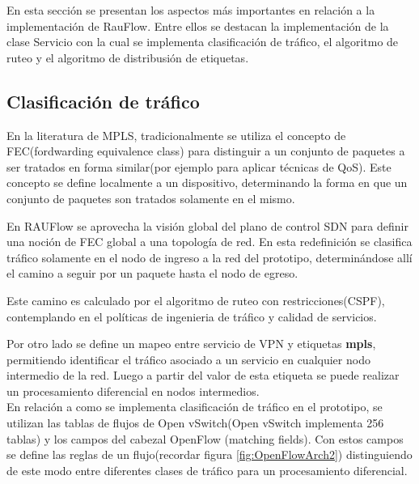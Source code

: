 En esta secci\'on se presentan los aspectos m\'as importantes en relaci\'on a la implementaci\'on de RauFlow. Entre ellos se destacan la implementaci\'on de la clase Servicio con la cual se implementa  clasificaci\'on de tr\'afico, el algoritmo de ruteo y el algoritmo de distribusi\'on de etiquetas.\\

\subsection{Clasificación de tr\'afico}
En la literatura de MPLS, tradicionalmente se utiliza el concepto de FEC(fordwarding equivalence class) para distinguir a un conjunto de paquetes a ser tratados en forma similar(por ejemplo para aplicar t\'ecnicas de QoS). Este concepto se define localmente a un dispositivo, determinando la forma en que un conjunto de paquetes son tratados solamente en el mismo.

En RAUFlow se aprovecha la visi\'on global del plano de control SDN para definir una noci\'on de FEC global a una topolog\'ia de red. En esta redefinici\'on se clasifica tr\'afico solamente en el nodo de ingreso a la red del prototipo, determinándose all\'i el camino a seguir por un paquete hasta el nodo de egreso. 

Este camino es calculado por el algoritmo de ruteo con restricciones(CSPF), contemplando en el políticas de ingenieria de tr\'afico y calidad de servicios. 

Por otro lado se define un mapeo entre servicio de VPN y etiquetas \textbf{mpls}, permitiendo identificar el tr\'afico asociado a un servicio en cualquier nodo intermedio de la red. Luego a partir del valor de esta etiqueta se puede realizar un procesamiento diferencial en nodos intermedios.\\


En relaci\'on a como se implementa clasificaci\'on de tr\'afico en el prototipo, se utilizan las tablas de flujos de Open vSwitch(Open vSwitch implementa 256 tablas) y los campos del cabezal OpenFlow (matching fields). Con estos campos se define las reglas de un flujo(recordar figura \ref{fig:OpenFlowArch2}) distinguiendo de este modo entre diferentes clases de tr\'afico para un procesamiento diferencial.

